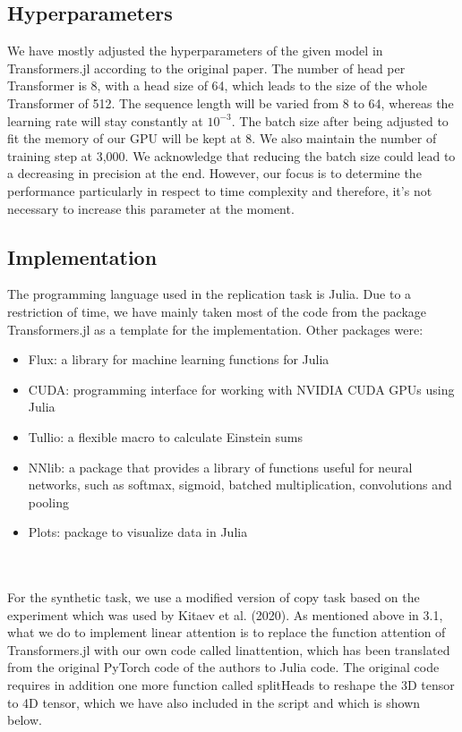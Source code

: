\documentclass[DIV=13,fontsize=11pt]{scrartcl}
\begin{document}
\subsection{Hyperparameters}
We have mostly adjusted the hyperparameters of the given model in Transformers.jl according to the original paper. The number of head per Transformer is 8, with a head size of 64, which leads to the size of the whole Transformer of 512. The sequence length will be varied from 8 to 64, whereas the learning rate will stay constantly at  \(10^{-3}\).  The batch size after being adjusted to fit the memory of our GPU will be kept at 8. We also maintain the number of training step at 3,000. We acknowledge that reducing the batch size could lead to a decreasing in precision at the end. However, our focus is to determine the performance particularly in respect to time complexity and therefore, it's not necessary to increase this parameter at the moment. 

\subsection{Implementation}
The programming language used in the replication task is Julia. Due to a restriction of time, we have mainly taken most of the code from the package Transformers.jl as a template for the implementation. Other packages were:
\begin{itemize}
    \item Flux: a library for machine learning functions for Julia
    \item CUDA: programming interface for working with NVIDIA CUDA GPUs using Julia
    \item Tullio: a flexible macro to calculate Einstein sums
    \item NNlib: a package that provides a library of functions useful for neural networks, such as softmax, sigmoid, batched multiplication, convolutions and pooling
    \item Plots: package to visualize data in Julia
\end{itemize} \\


\\ For the synthetic task, we use a modified version of copy task based on the experiment which was used by Kitaev et al.  (2020). As mentioned above in 3.1, what we do to implement linear attention is to replace the function attention of Transformers.jl with our own code called linattention, which has been translated from the original PyTorch code of the authors to Julia code. The original code requires in addition one more function called splitHeads to reshape the 3D tensor to 4D tensor, which we have also included in the script and which is shown below. 
\end{document}
